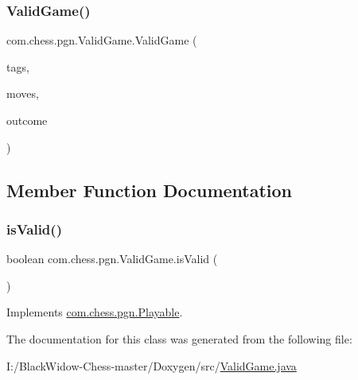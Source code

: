 \subsubsection{\texorpdfstring{ValidGame()}{ValidGame()}}
{\footnotesize\ttfamily com.\+chess.\+pgn.\+Valid\+Game.\+Valid\+Game (\begin{DoxyParamCaption}\item[{final \mbox{\hyperlink{classcom_1_1chess_1_1pgn_1_1_p_g_n_game_tags}{P\+G\+N\+Game\+Tags}}}]{tags,  }\item[{List$<$ String $>$}]{moves,  }\item[{final String}]{outcome }\end{DoxyParamCaption})}



\subsection{Member Function Documentation}
\mbox{\label{classcom_1_1chess_1_1pgn_1_1_valid_game_a4ec1fb23ee3461e3a089b298e75999d9}} 
\subsubsection{\texorpdfstring{isValid()}{isValid()}}
{\footnotesize\ttfamily boolean com.\+chess.\+pgn.\+Valid\+Game.\+is\+Valid (\begin{DoxyParamCaption}{ }\end{DoxyParamCaption})}



Implements \mbox{\hyperlink{interfacecom_1_1chess_1_1pgn_1_1_playable_a57cbba467e07e07bf9fe35144a970ce6}{com.\+chess.\+pgn.\+Playable}}.



The documentation for this class was generated from the following file\+:\begin{DoxyCompactItemize}
\item 
I\+:/\+Black\+Widow-\/\+Chess-\/master/\+Doxygen/src/\mbox{\hyperlink{_valid_game_8java}{Valid\+Game.\+java}}\end{DoxyCompactItemize}
